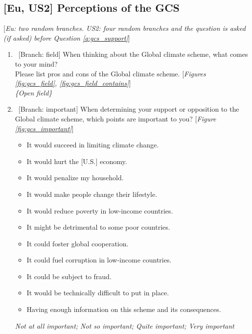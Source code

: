 \subsection*{[Eu, US2] Perceptions of the GCS}\label{subsec:questionnaire_perceptions}
[\textit{Eu: two random branches. US2: four random branches and the question is asked (if asked) before Question \ref{q:gcs_support}}]
\begin{enumerate}[resume] \item ~[Branch: field] \label{q:gcs_field} When thinking about the Global climate scheme, what comes to your mind? \\ Please list pros and cons of the Global climate scheme. [\textit{Figures \ref{fig:gcs_field}, \ref{fig:gcs_field_contains}}]
\\ \textit{\{Open field\}} 
\item ~[Branch: important] \label{q:gcs_important} When determining your support or opposition to the Global climate scheme, which points are important to you? [\textit{Figure \ref{fig:gcs_important}}]
\begin{itemize}
    \item It would succeed in limiting climate change. 
    \item It would hurt the [U.S.] economy. 
    \item It would penalize my household. 
    \item It would make people change their lifestyle. 
    \item It would reduce poverty in low-income countries. 
    \item It might be detrimental to some poor countries. 
    \item It could foster global cooperation. 
    \item It could fuel corruption in low-income countries. 
    \item It could be subject to fraud. 
    \item It would be technically difficult to put in place. 
    \item Having enough information on this scheme and its consequences. 
\end{itemize}
\textit{Not at all important; Not so important; Quite important; Very important}
\end{enumerate}

